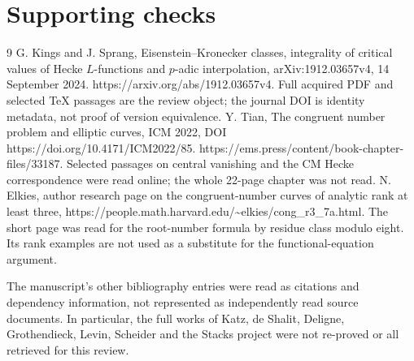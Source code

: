 \documentclass[10pt]{article}
\begin{document}
\section*{Supporting checks}
9 G. Kings and J. Sprang, Eisenstein–Kronecker classes, integrality of critical values of Hecke \(L\)-functions and \(p\)-adic interpolation, arXiv:1912.03657v4, 14 September 2024. https://arxiv.org/abs/1912.03657v4. Full acquired PDF and selected TeX passages are the review object; the journal DOI is identity metadata, not proof of version equivalence. Y. Tian, The congruent number problem and elliptic curves, ICM 2022, DOI https://doi.org/10.4171/ICM2022/85. https://ems.press/content/book-chapter-files/33187. Selected passages on central vanishing and the CM Hecke correspondence were read online; the whole 22-page chapter was not read. N. Elkies, author research page on the congruent-number curves of analytic rank at least three, https://people.math.harvard.edu/\textasciitilde{}elkies/cong\_r3\_7a.html. The short page was read for the root-number formula by residue class modulo eight. Its rank examples are not used as a substitute for the functional-equation argument.\par
The manuscript’s other bibliography entries were read as citations and dependency information, not represented as independently read source documents. In particular, the full works of Katz, de Shalit, Deligne, Grothendieck, Levin, Scheider and the Stacks project were not re-proved or all retrieved for this review.\par
\end{document}
